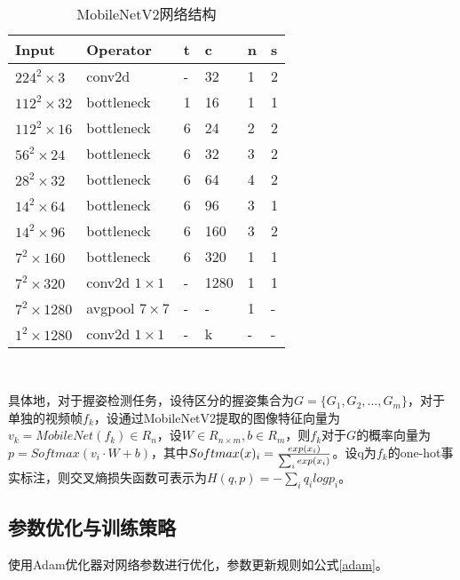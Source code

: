 \begin{table}[htbp]
  \centering
  \caption{MobileNetV2网络结构}
  \label{tab:MobileNetV2}
    \\[5pt]
    \begin{tabular}{p{80pt}p{80pt}p{40pt}p{40pt}p{40pt}p{40pt}}
      \toprule
      Input & Operator & t & c & n & s\\
      \midrule
      $224^2 \times 3$  &  conv2d & - & 32 & 1 & 2 \\
      $112^2 \times 32$  &  bottleneck & 1 & 16 & 1 & 1 \\
      $112^2 \times 16$  &  bottleneck & 6 & 24 & 2 & 2 \\
      $56^2 \times 24$  &  bottleneck & 6 & 32 & 3 & 2 \\
      $28^2 \times 32$  &  bottleneck & 6 & 64 & 4 & 2 \\
      $14^2 \times 64$  &  bottleneck & 6 & 96 & 3 & 1 \\
      $14^2 \times 96$  &  bottleneck & 6 & 160 & 3 & 2 \\
      $7^2 \times 160$  &  bottleneck & 6 & 320 & 1 & 1 \\
      $7^2 \times 320$  &  conv2d $1\times1$ & - & 1280 & 1 & 1 \\
      $7^2 \times 1280$  &  avgpool $7\times7$ & - & - & 1 & - \\
      $1^2 \times 1280$  &  conv2d $1\times1$ & - & k & - & - \\
      \bottomrule
    \end{tabular}\\[5pt]
\end{table}


具体地，对于握姿检测任务，设待区分的握姿集合为$G=\{G_1,G_2,...,G_m\}$，对于单独的视频帧$f_k$，设通过MobileNetV2提取的图像特征向量为$v_k=MobileNet(f_k) \in R_{n}$，设$W \in R_{n \times m}, b \in R_{m}$，则$f_k$对于$G$的概率向量为$p = Softmax(v_i \cdot W + b)$，其中$Softmax(x)_i = {{exp(x_i)} \over {\sum_i exp(x_i)}}$。设q为$f_k$的one-hot事实标注，则交叉熵损失函数可表示为$H(q,p)=-\sum_i q_i logp_i$。

\subsection{参数优化与训练策略}

使用Adam优化器\cite{2014arXiv1412.6980K}对网络参数进行优化，参数更新规则如公式\ref{adam}。

